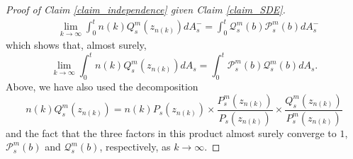 \documentclass{article}
\theoremstyle{definition}
\theoremstyle{remark}
\theoremstyle{remark}
\begin{document}
\begin{proof}[Proof of Claim \ref{claim_independence} given Claim \ref{claim_SDE}]
\begin{align*}
    & \lim_{k \to \infty} \int_{0}^{t} n(k)Q_s^{m}(z_{n(k)}) dA_s^{-} =  \int_{0}^{t} \mathcal{Q}_s^{m}(b) \mathcal{P}_s^m(b)dA_s^{-}
\end{align*}
which shows that, almost surely,
\begin{equation*}
    \lim_{k \to \infty} \int_{0}^{t} n(k)Q_s^{m}(z_{n(k)}) dA_s =  \int_{0}^{t} \mathcal{P}_s^m(b) \mathcal{Q}_s^{m}(b) dA_s.
\end{equation*}
Above, we have also used the decomposition
\begin{equation*}
    n(k)Q_s^m(z_{n(k)}) = n(k)P_s(z_{n(k)}) \times \frac{P_s^m(z_{n(k)})}{P_s(z_{n(k)})} \times \frac{Q_s^m(z_{n(k)})}{P_s^m(z_{n(k)})}
\end{equation*}
and the fact that the three factors in this product almost surely converge to $1$, $\mathcal{P}_s^m(b)$ and $\mathcal{Q}_s^m(b)$, respectively, as $k \to \infty$.
\end{proof}
\end{document}

